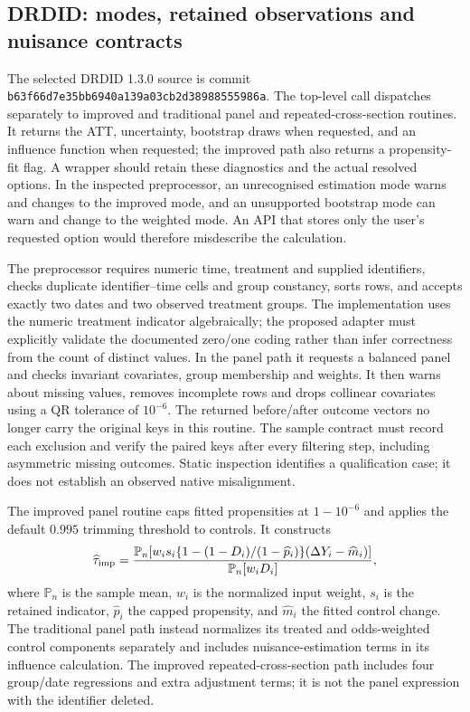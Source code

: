 \subsection{DRDID: modes, retained observations and nuisance contracts}
The selected DRDID 1.3.0 source is commit
\texttt{b63f66d7e35bb6940a139a03cb2d38988555986a}.
The top-level call dispatches separately to improved and traditional panel
and repeated-cross-section routines. It returns the ATT, uncertainty,
bootstrap draws when requested, and an influence function when requested;
the improved path also returns a propensity-fit flag. A wrapper should
retain these diagnostics and the actual resolved options. In the inspected
preprocessor, an unrecognised estimation mode warns and changes to the
improved mode, and an unsupported bootstrap mode can warn and change to the
weighted mode. An API that stores only the user's requested option would
therefore misdescribe the calculation.~\citep{exec24_drdid_reuse_source}

The preprocessor requires numeric time, treatment and supplied identifiers,
checks duplicate identifier--time cells and group constancy, sorts rows,
and accepts exactly two dates and two observed treatment groups. The
implementation uses the numeric treatment indicator algebraically; the
proposed adapter must explicitly validate the documented zero/one coding
rather than infer correctness from the count of distinct values. In the
panel path it requests a balanced panel and checks invariant covariates,
group membership and weights. It then warns about missing values, removes
incomplete rows and drops collinear covariates using a QR tolerance of
$10^{-6}$. The returned before/after outcome vectors no longer carry the
original keys in this routine. The sample contract must record each exclusion
and verify the paired keys after every filtering step, including asymmetric
missing outcomes. Static inspection identifies a qualification case; it does
not establish an observed native misalignment.~\citep{exec24_drdid_reuse_source}

The improved panel routine caps fitted propensities at $1-10^{-6}$ and
applies the default $0.995$ trimming threshold to controls. It constructs
\[
 \widehat\tau_{\rm imp}
 =\frac{\mathbb P_n[ w_i s_i
       \{1-(1-D_i)/(1-\widehat p_i)\}
       (\Delta Y_i-\widehat m_i)]}{\mathbb P_n[w_iD_i]},
\]
where $\mathbb P_n$ is the sample mean, $w_i$ is the normalized input weight,
$s_i$ is the retained indicator, $\widehat p_i$ the capped propensity, and
$\widehat m_i$ the fitted control change. The traditional panel path instead
normalizes its treated and odds-weighted control components separately and
includes nuisance-estimation terms in its influence calculation. The improved
repeated-cross-section path includes four group/date regressions and extra
adjustment terms; it is not the panel expression with the identifier deleted.
\citep{exec24_drdid_reuse_source}


